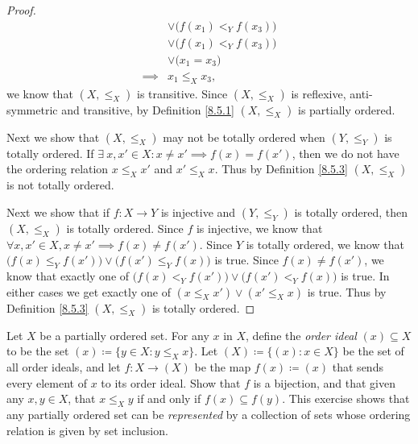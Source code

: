 \begin{proof}
\begin{align*}
                 & \lor \big(f(x_1) <_Y f(x_3)\big)                                                                                                    \\
                 & \lor \big(f(x_1) <_Y f(x_3)\big)                                                                                                    \\
                 & \lor \big(x_1 = x_3\big)                                                                                                            \\
        \implies & x_1 \leq_X x_3,
    \end{align*}
    we know that \((X, \leq_X)\) is transitive.
    Since \((X, \leq_X)\) is reflexive, anti-symmetric and transitive, by Definition \ref{8.5.1} \((X, \leq_X)\) is partially ordered.

    Next we show that \((X, \leq_X)\) may not be totally ordered when \((Y, \leq_Y)\) is totally ordered.
    If \(\exists\ x, x' \in X : x \neq x' \implies f(x) = f(x')\), then we do not have the ordering relation \(x \leq_X x'\) and \(x' \leq_X x\).
    Thus by Definition \ref{8.5.3} \((X, \leq_X)\) is not totally ordered.

    Next we show that if \(f : X \to Y\) is injective and \((Y, \leq_Y)\) is totally ordered, then \((X, \leq_X)\) is totally ordered.
    Since \(f\) is injective, we know that \(\forall x, x' \in X, x \neq x' \implies f(x) \neq f(x')\).
    Since \(Y\) is totally ordered, we know that \(\big(f(x) \leq_Y f(x')\big) \lor \big(f(x') \leq_Y f(x)\big)\) is true.
    Since \(f(x) \neq f(x')\), we know that exactly one of \(\big(f(x) <_Y f(x')\big) \lor \big(f(x') <_Y f(x)\big)\) is true.
    In either cases we get exactly one of \((x \leq_X x') \lor (x' \leq_X x)\) is true.
    Thus by Definition \ref{8.5.3} \((X, \leq_X)\) is totally ordered.
\end{proof}

\begin{exercise}\label{ex 8.5.6}
    Let \(X\) be a partially ordered set.
    For any \(x\) in \(X\), define the \emph{order ideal} \((x) \subseteq X\) to be the set \((x) \coloneqq \{y \in X : y \leq_X x\}\).
    Let \((X) \coloneqq \{(x) : x \in X\}\) be the set of all order ideals, and let \(f : X \to (X)\) be the map \(f(x) \coloneqq (x)\) that sends every element of \(x\) to its order ideal.
    Show that \(f\) is a bijection, and that given any \(x, y \in X\), that \(x \leq_X y\) if and only if \(f(x) \subseteq f(y)\).
    This exercise shows that any partially ordered set can be \emph{represented} by a collection of sets whose ordering relation is given by set inclusion.
\end{exercise}


